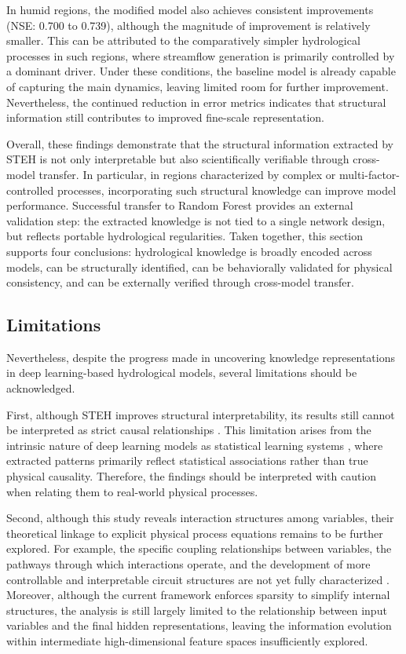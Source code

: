 In humid regions, the modified model also achieves consistent improvements (NSE: 0.700 to 0.739), although the magnitude of improvement is relatively smaller. This can be attributed to the comparatively simpler hydrological processes in such regions\cite{hess-25-2997-2021}, where streamflow generation is primarily controlled by a dominant driver. Under these conditions, the baseline model is already capable of capturing the main dynamics, leaving limited room for further improvement. Nevertheless, the continued reduction in error metrics indicates that structural information still contributes to improved fine-scale representation\cite{ABBASI2021125717}.

Overall, these findings demonstrate that the structural information extracted by STEH is not only interpretable but also scientifically verifiable through cross-model transfer. In particular, in regions characterized by complex or multi-factor-controlled processes, incorporating such structural knowledge can improve model performance. Successful transfer to Random Forest provides an external validation step: the extracted knowledge is not tied to a single network design, but reflects portable hydrological regularities. Taken together, this section supports four conclusions: hydrological knowledge is broadly encoded across models, can be structurally identified, can be behaviorally validated for physical consistency, and can be externally verified through cross-model transfer.

\subsection{Limitations}
Nevertheless, despite the progress made in uncovering knowledge representations in deep learning-based hydrological models, several limitations should be acknowledged.

First, although STEH improves structural interpretability, its results still cannot be interpreted as strict causal relationships \cite{lipton2018mythos}. This limitation arises from the intrinsic nature of deep learning models as statistical learning systems \cite{pearl2018theoreticalimpedimentsmachinelearning}, where extracted patterns primarily reflect statistical associations rather than true physical causality. Therefore, the findings should be interpreted with caution when relating them to real-world physical processes.

Second, although this study reveals interaction structures among variables, their theoretical linkage to explicit physical process equations remains to be further explored. For example, the specific coupling relationships between variables, the pathways through which interactions operate, and the development of more controllable and interpretable circuit structures are not yet fully characterized \cite{pach2025sparseautoencoderslearnmonosemantic}. Moreover, although the current framework enforces sparsity to simplify internal structures, the analysis is still largely limited to the relationship between input variables and the final hidden representations, leaving the information evolution within intermediate high-dimensional feature spaces insufficiently explored.

